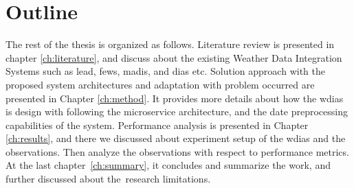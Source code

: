 \section{Outline}
The rest of the thesis is organized as follows. Literature review is presented in chapter \ref{ch:literature}, and discuss about the existing Weather Data Integration Systems such as \acrshort{lead}, \acrshort{fews}, \acrshort{madis}, and \acrshort{dias} etc. Solution approach with the proposed system architectures and adaptation with problem occurred are presented in Chapter \ref{ch:method}. It provides more details about how the \acrshort{wdias} is design with following the microservice architecture, and the date preprocessing capabilities of the system. Performance analysis is presented in Chapter \ref{ch:results}, and there we discussed about experiment setup of the \acrshort{wdias} and the observations. Then analyze the observations with respect to performance metrics. At the last chapter \ref{ch:summary}, it concludes and summarize the work, and further discussed about the research limitations.
